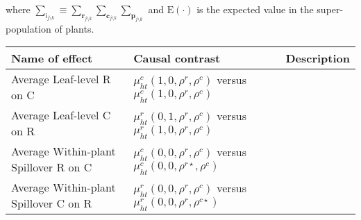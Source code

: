 \documentclass[]{article}
\begin{document}
where
\(\sum_{\mathsf{i}_{j \setminus k}} \equiv \sum_{\mathbf{r}_{j \setminus k}} \sum_{\mathbf{c}_{j \setminus k}} \sum_{\mathbf{p}_{j \setminus k}}\)
and \(\mathrm{E}(\cdot)\) is the expected value in the super-population
of plants.

\begin{longtable}[]{@{}lll@{}}
\toprule
\begin{minipage}[b]{0.26\columnwidth}\raggedright
Name of effect\strut
\end{minipage} & \begin{minipage}[b]{0.31\columnwidth}\raggedright
Causal contrast\strut
\end{minipage} & \begin{minipage}[b]{0.34\columnwidth}\raggedright
Description\strut
\end{minipage}\tabularnewline
\midrule
\endhead
\begin{minipage}[t]{0.26\columnwidth}\raggedright
Average Leaf-level R on C\strut
\end{minipage} & \begin{minipage}[t]{0.31\columnwidth}\raggedright
\(\mu^c_{ht}(1, 0, \rho^r, \rho^c)\) versus
\(\mu^c_{ht}(1, 0, \rho^r, \rho^c)\)\strut
\end{minipage} & \begin{minipage}[t]{0.34\columnwidth}\raggedright
\strut
\end{minipage}\tabularnewline
\begin{minipage}[t]{0.26\columnwidth}\raggedright
Average Leaf-level C on R\strut
\end{minipage} & \begin{minipage}[t]{0.31\columnwidth}\raggedright
\(\mu^r_{ht}(0, 1, \rho^r, \rho^c)\) versus
\(\mu^r_{ht}(1, 0, \rho^r, \rho^c)\)\strut
\end{minipage} & \begin{minipage}[t]{0.34\columnwidth}\raggedright
\strut
\end{minipage}\tabularnewline
\begin{minipage}[t]{0.26\columnwidth}\raggedright
Average Within-plant Spillover R on C\strut
\end{minipage} & \begin{minipage}[t]{0.31\columnwidth}\raggedright
\(\mu^c_{ht}(0, 0, \rho^r, \rho^c)\) versus
\(\mu^c_{ht}(0, 0, \rho^{r\star}, \rho^c)\)\strut
\end{minipage} & \begin{minipage}[t]{0.34\columnwidth}\raggedright
\strut
\end{minipage}\tabularnewline
\begin{minipage}[t]{0.26\columnwidth}\raggedright
Average Within-plant Spillover C on R\strut
\end{minipage} & \begin{minipage}[t]{0.31\columnwidth}\raggedright
\(\mu^r_{ht}(0, 0, \rho^r, \rho^c)\) versus
\(\mu^r_{ht}(0, 0, \rho^{r}, \rho^{c\star})\)\strut
\end{minipage} & \begin{minipage}[t]{0.34\columnwidth}\raggedright
\strut
\end{minipage}\tabularnewline
\bottomrule
\end{longtable}
\end{document}
